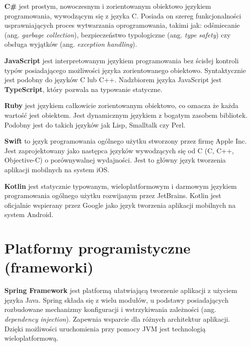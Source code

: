 \textbf{C\#} jest prostym, nowoczesnym i zorientowanym obiektowo językiem programowania, wywodzącym się z języka C. Posiada on szereg funkcjonalności usprawniających proces wytwarzania oprogramowania, takimi jak: odśmiecanie (ang. \textit{garbage collection}), bezpieczeństwo typologiczne (ang. \textit{type safety}) czy obsługa wyjątków (ang. \textit{exception handling}).\cite{wagner_wenzel_latham_onderka_2016}


\textbf{JavaScript} jest interpretowanym językiem programowania bez ścisłej kontroli typów posiadającego możliwości języka zorientowanego obiektowo. Syntaktycznie jest podobny do języków C lub C++.\cite{davidflanagan2006} Nadzbiorem języka JavaScript jest \textbf{TypeScript}, który pozwala na typowanie statyczne.


\textbf{Ruby} jest językiem całkowicie zorientowanym obiektowo, co oznacza że każda wartość jest obiektem. Jest dynamicznym językiem z bogatym zasobem bibliotek. Podobny jest do takich języków jak Lisp, Smalltalk czy Perl.\cite{davidflanaganyukihiromatsimoto2008}


\textbf{Swift} to język programowania ogólnego użytku stworzony przez firmę Apple Inc. Jest zaprojektowany jako następca języków wywodzących się od C (C, C++, Objective-C) o porównywalnej wydajności. Jest to główny język tworzenia aplikacji mobilnych na system iOS.\cite{swift}


\textbf{Kotlin} jest statycznie typowanym, wieloplatformowym i darmowym językiem programowania ogólnego użytku rozwijanym przez JetBrains.\cite{kotlin} Kotlin jest oficjalnie wspierany przez Google jako język tworzenia aplikacji mobilnych na system Android.\cite{kotlingoogle}

\section{Platformy programistyczne (frameworki)}
\textbf{Spring Framework} jest platformą ułatwiającą tworzenie aplikacji z użyciem języka Java. Spring składa się z wielu modułów, u podstawy posiadających rozbudowane mechanizmy konfiguracji i wstrzykiwania zależności (ang. \textit{dependency injection}). Zapewnia wsparcie dla różnych architektur aplikacji.\cite{spring} Dzięki możliwości uruchomienia przy pomocy JVM jest technologią wieloplatformową.

